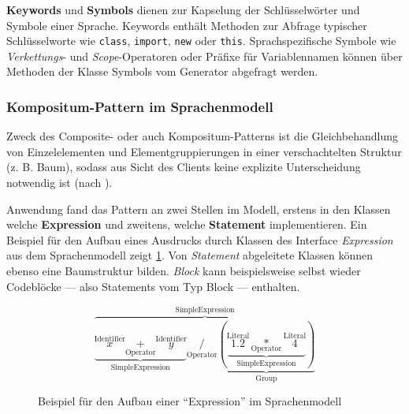 \textbf{Keywords} und \textbf{Symbols} dienen zur Kapselung der Schlüsselwörter und Symbole einer Sprache. Keywords enthält Methoden zur Abfrage typischer Schlüsselworte wie \texttt{class}, \texttt{import}, \texttt{new} oder \texttt{this}. Sprachspezifische Symbole wie \emph{Verkettungs}- und \emph{Scope}-Operatoren oder Präfixe für Variablennamen können über Methoden der Klasse Symbols vom Generator abgefragt werden.

\subsubsection{Kompositum-Pattern im Sprachenmodell}
\label{sec:composite_pattern}

Zweck des Composite- oder auch Kompositum-Patterns ist die Gleichbehandlung von Einzelelementen und Elementgruppierungen in einer verschachtelten Struktur
(z. B. Baum), sodass aus Sicht des Clients keine explizite Unterscheidung
notwendig ist (nach \cite[][S. 102]{patternsKompakt}).

Anwendung fand das Pattern an zwei Stellen im Modell, erstens in den Klassen welche \textbf{Expression} und zweitens, welche \textbf{Statement} implementieren.
Ein Beispiel für den Aufbau eines Ausdrucks durch Klassen des Interface \emph{Expression} aus dem Sprachenmodell zeigt \cref{fig:example_expression}. Von \emph{Statement} abgeleitete Klassen können ebenso eine Baumstruktur bilden. \emph{Block} kann beispielsweise selbst wieder Codeblöcke --- also Statements vom Typ Block --- enthalten. 

\begin{figure}
    \[
        \overbrace{
            \underbrace{
                \overset{\text{Identifier}}{x} \underset{\text{Operator}}{+} \overset{\text{Identifier}}{y}
            }_{\text{SimpleExpression}} 
            \underset{\text{Operator}}{/}
            \underbrace{
                ( 
                    \underbrace{
                        \overset{\text{Literal}}{1.2} \underset{\text{Operator}}{*} \overset{\text{Literal}}{4}
                    }_{\text{SimpleExpression}} 
                )
            }_{\text{Group}}
        }^{\text{SimpleExpression}} 
    \]   
    \caption{Beispiel für den Aufbau einer \enquote{Expression} im Sprachenmodell}
    \label{fig:example_expression}
\end{figure}
